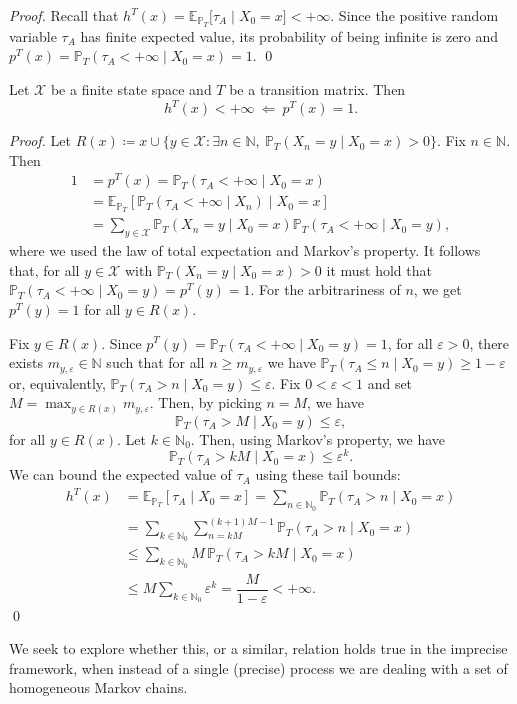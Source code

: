 \documentclass{svproc}
\newcommand{\X}{\mathcal{X}}
\newcommand{\N}{\mathbb{N}}
\newcommand{\PP}{\mathbb{P}}
\newcommand{\EE}{\mathbb{E}}
\begin{document}
\begin{proof}
    Recall that $h^T(x)=\EE_{\PP_T}\bigl[\tau_A \mid X_0=x\bigr]<+\infty$. Since the positive random variable $\tau_A$ has finite expected value, its probability of being infinite is zero and $p^T(x)=\PP_T(\tau_A<+\infty \mid X_0=x)=1$. \qed
\end{proof}
\begin{proposition}\label{prop:leftimpl}
    Let $\X$ be a finite state space and $T$ be a transition matrix. Then 
    \begin{equation}
        h^T(x)<+\infty \ \Leftarrow \ p^T(x)=1.
    \end{equation}
\end{proposition}
\begin{proof}
    Let $R(x)\coloneqq x \cup \{y\in \X: \exists n\in \N, \ \PP_T(X_n=y \mid X_0=x)>0\}.$ Fix $n\in \N$. Then
    \begin{align}
        1&=p^T(x)=\PP_T(\tau_A<+\infty\mid X_0=x)\nonumber\\
        &= \EE_{\PP_T}\left[\PP_T(\tau_A<+\infty \mid X_n) \mid X_0=x \right] \nonumber\\
        &=\sum_{y\in \X}\PP_T(X_n=y\mid X_0=x)\PP_T(\tau_A<+\infty\mid X_0=y), \label{rompicapo}
    \end{align}
    where we used the law of total expectation and Markov's property. It follows that, for all $y\in \X$ with $\PP_T(X_n=y\mid X_0=x)>0$ it must hold that $\PP_T(\tau_A<+\infty\mid X_0=y)=p^T(y)=1$. For the arbitrariness of $n$, we get $p^T(y)=1$ for all $y\in R(x)$.

    Fix $y\in R(x)$. Since $p^T(y)= \PP_T(\tau_A<+\infty\mid X_0=y)=1$, for all $\varepsilon>0$, there exists $m_{y,\varepsilon}\in\N$ such that for all $n\ge m_{y,\varepsilon}$ we have $\PP_T(\tau_A\le n\mid X_0=y)\ge 1-\varepsilon$ or, equivalently, $\PP_T(\tau_A> n\mid X_0=y)\le\varepsilon$.
Fix $0<\varepsilon<1$ and set $M=\max_{y\in R(x)} m_{y,\varepsilon}$. Then, by picking $n=M$, we have
\[
\PP_T(\tau_A> M\mid X_0=y)\le\varepsilon,
\]
for all $y\in R(x)$.
Let $k\in \N_0$. Then, using Markov's property, we have
\[
\PP_T(\tau_A>kM\mid X_0=x)\le\varepsilon^k.
\]
We can bound the expected value of $\tau_A$ using these tail bounds:
\begin{align*}
    h^T(x)&=\EE_{\PP_T}[\tau_A\mid X_0=x] = {\sum_{n\in \N_0}\PP_T(\tau_A>n\mid X_0=x)}\\
&= \sum_{k\in \N_0}\sum_{n=kM}^{(k+1)M-1}\PP_T(\tau_A>n\mid X_0=x)\\
&\le \sum_{k\in \N_0} M\,\PP_T(\tau_A>kM\mid X_0=x)\\
&\le M\sum_{k\in \N_0}\varepsilon^k= \dfrac{M}{1-\varepsilon}<+\infty. 
\end{align*}
\qed
\end{proof}
We seek to explore whether this, or a similar, relation holds true in the imprecise framework, when instead of a single (precise) process we are dealing with a set of homogeneous Markov chains.
\end{document}
